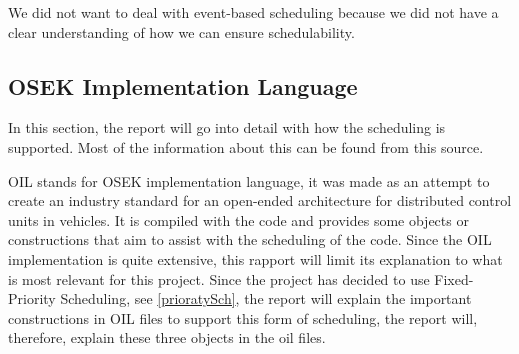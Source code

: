 We did not want to deal with event-based scheduling because we did not have a clear understanding of how we can ensure schedulability.

\subsection{OSEK Implementation Language}\label{OILteo}
In this section, the report will go into detail with how the scheduling is supported. Most of the information about this can be found from this source\cite{OILManual}.

OIL stands for OSEK implementation language, it was made as an attempt to create an industry standard for an open-ended architecture for distributed control units in vehicles\cite{OILManual}. It is compiled with the code and provides some objects or constructions that aim to assist with the scheduling of the code. Since the OIL implementation is quite extensive, this rapport will limit its explanation to what is most relevant for this project. Since the project has decided to use Fixed-Priority Scheduling, see \ref{prioratySch}, the report will explain the important constructions in OIL files to support this form of scheduling, the report will, therefore, explain these three objects in the oil files.

